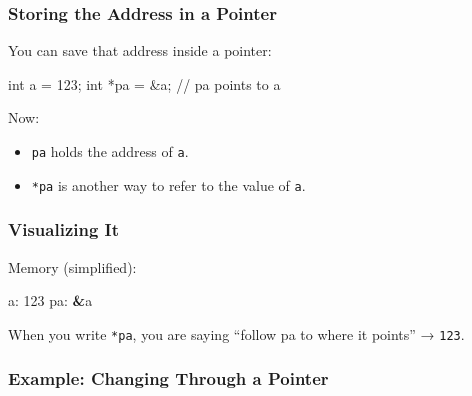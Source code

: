 \documentclass[
  letterpaper,
  DIV=11,
  numbers=noendperiod]{scrreprt}
\newenvironment{Shaded}{\begin{snugshade}}{\end{snugshade}}
\newcommand{\CommentTok}[1]{\textcolor[rgb]{0.37,0.37,0.37}{#1}}
\newcommand{\DataTypeTok}[1]{\textcolor[rgb]{0.68,0.00,0.00}{#1}}
\newcommand{\DecValTok}[1]{\textcolor[rgb]{0.68,0.00,0.00}{#1}}
\newcommand{\ExtensionTok}[1]{\textcolor[rgb]{0.00,0.23,0.31}{#1}}
\newcommand{\KeywordTok}[1]{\textcolor[rgb]{0.00,0.23,0.31}{\textbf{#1}}}
\newcommand{\NormalTok}[1]{\textcolor[rgb]{0.00,0.23,0.31}{#1}}
\newcommand{\OperatorTok}[1]{\textcolor[rgb]{0.37,0.37,0.37}{#1}}
\providecommand{\tightlist}{%
  \setlength{\itemsep}{0pt}\setlength{\parskip}{0pt}}
\begin{document}
\subsubsection{Storing the Address in a
Pointer}\label{storing-the-address-in-a-pointer}

You can save that address inside a pointer:

\begin{Shaded}
\begin{Highlighting}[]
\DataTypeTok{int}\NormalTok{ a }\OperatorTok{=} \DecValTok{123}\OperatorTok{;}
\DataTypeTok{int} \OperatorTok{*}\NormalTok{pa }\OperatorTok{=} \OperatorTok{\&}\NormalTok{a}\OperatorTok{;}   \CommentTok{// pa points to a}
\end{Highlighting}
\end{Shaded}

Now:

\begin{itemize}
\tightlist
\item
  \texttt{pa} holds the address of \texttt{a}.
\item
  \texttt{*pa} is another way to refer to the value of \texttt{a}.
\end{itemize}

\subsubsection{Visualizing It}\label{visualizing-it}

Memory (simplified):

\begin{Shaded}
\begin{Highlighting}[]
 \ExtensionTok{a:}\NormalTok{  123}
\ExtensionTok{pa:}  \KeywordTok{\&}\ExtensionTok{a}
\end{Highlighting}
\end{Shaded}

When you write \texttt{*pa}, you are saying ``follow pa to where it
points'' → \texttt{123}.

\subsubsection{Example: Changing Through a
Pointer}\label{example-changing-through-a-pointer}
\end{document}
